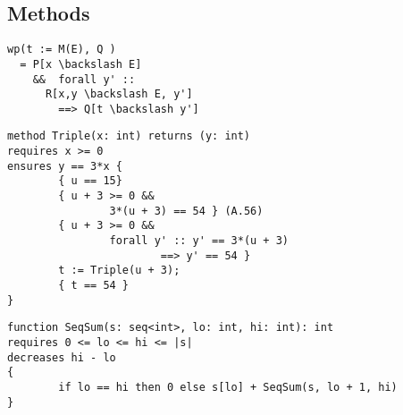 \subsection{Methods} 
\begin{multicols}{2}
\begin{verbatim}
wp(t := M(E), Q )
  = P[x \backslash E]
    &&  forall y' ::
      R[x,y \backslash E, y'] 
        ==> Q[t \backslash y']
\end{verbatim}
\columnbreak
\begin{tiny}
\begin{verbatim}
method Triple(x: int) returns (y: int)
requires x >= 0
ensures y == 3*x {
        { u == 15}
        { u + 3 >= 0 &&
                3*(u + 3) == 54 } (A.56)
        { u + 3 >= 0 &&
                forall y' :: y' == 3*(u + 3)
                        ==> y' == 54 }
        t := Triple(u + 3);
        { t == 54 }
}
\end{verbatim}
\end{tiny}
\end{multicols}
\begin{scriptsize}
\begin{verbatim}
function SeqSum(s: seq<int>, lo: int, hi: int): int
requires 0 <= lo <= hi <= |s|
decreases hi - lo
{
        if lo == hi then 0 else s[lo] + SeqSum(s, lo + 1, hi)
}
\end{verbatim}
\end{scriptsize}